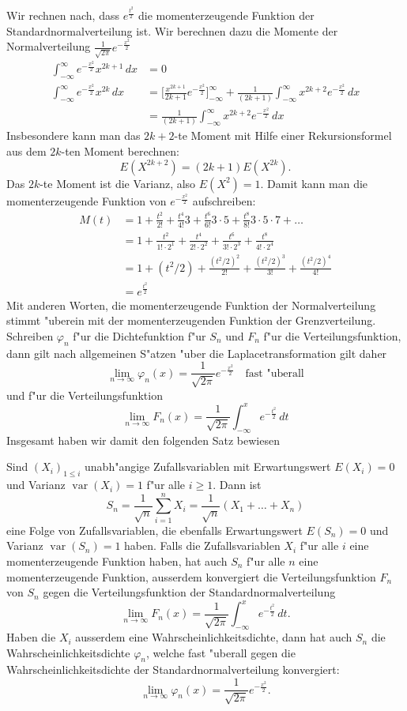 Wir rechnen nach, dass $e^{\frac{t^2}2}$ die momenterzeugende Funktion
der Standardnormalverteilung ist. Wir berechnen
dazu die Momente der Normalverteilung $\frac1{\sqrt{2\pi}}e^{-\frac{x^2}2}$
\begin{align*}
\int_{-\infty}^\infty e^{-\frac{x^2}2}x^{2k+1}\,dx&=0\\
\int_{-\infty}^\infty e^{-\frac{x^2}2}x^{2k}\,dx
&=
\biggl[\frac{x^{2k+1}}{2k+1}e^{-\frac{x^2}2}\biggr]_{-\infty}^\infty
+\frac1{(2k+1)}\int_{-\infty}^\infty x^{2k+2}e^{-\frac{x^2}2}\,dx\\
&=
\frac1{(2k+1)}\int_{-\infty}^\infty x^{2k+2}e^{-\frac{x^2}2}\,dx
\end{align*}
Insbesondere kann man das $2k+2$-te Moment mit Hilfe einer
Rekursionsformel aus dem $2k$-ten Moment berechnen:
\[
E(X^{2k+2})=(2k+1)E(X^{2k}).
\]
Das $2k$-te Moment ist die Varianz, also $E(X^2)=1$. Damit kann
man die momenterzeugende Funktion von $e^{-\frac{x^2}2}$ aufschreiben:
\begin{align*}
M(t)
&=
1+\frac{t^2}{2!} +\frac{t^4}{4!}3 +\frac{t^6}{6!}3\cdot5 +\frac{t^8}{8!}3\cdot5\cdot7+\dots\\
&=
1+\frac{t^2}{1!\cdot 2^1} +\frac{t^4}{2! \cdot 2^2} +\frac{t^6}{3!\cdot 2^3}
+\frac{t^8}{4!\cdot 2^4}\\
&=
1+(t^2/2) +\frac{(t^2/2)^2}{2!} +\frac{(t^2/2)^3}{3!}
+\frac{(t^2/2)^4}{4!}\\
&=e^{\frac{t^2}2}
\end{align*}
Mit anderen Worten, die momenterzeugende Funktion der Normalverteilung
stimmt "uberein mit der momenterzeugenden Funktion der Grenzverteilung.
Schreiben $\varphi_n$ f"ur die Dichtefunktion f"ur $S_n$ und $F_n$
f"ur die Verteilungsfunktion, dann gilt
nach allgemeinen S"atzen "uber die Laplacetransformation gilt daher
\[
\lim_{n\to\infty}\varphi_n(x)=\frac1{\sqrt{2\pi}}e^{-\frac{x^2}2}
\quad\text{fast "uberall}
\]
und f"ur die Verteilungsfunktion
\[
\lim_{n\to\infty}F_n(x)=\frac1{\sqrt{2\pi}}\int_{-\infty}^xe^{-\frac{t^2}2}\,dt
\]
Insgesamt haben wir damit den folgenden Satz bewiesen
\begin{satz}
\label{satz-zentraler-grenzwertsatz}
Sind $(X_i)_{1\le i}$ unabh"angige Zufallsvariablen mit
Erwartungswert $E(X_i)=0$ und Varianz $\operatorname{var}(X_i)=1$
f"ur alle $i\ge 1$. Dann ist
\[
S_n=\frac1{\sqrt{n}}\sum_{i=1}^nX_i=\frac1{\sqrt{n}}(X_1+\dots+X_n)
\]
eine Folge von Zufallsvariablen, die ebenfalls Erwartungswert $E(S_n)=0$
und Varianz $\operatorname{var}(S_n)=1$ haben. Falls die Zufallsvariablen
$X_i$
f"ur alle $i$ eine momenterzeugende Funktion haben, hat auch $S_n$
f"ur alle $n$ eine momenterzeugende Funktion, ausserdem konvergiert
die Verteilungsfunktion $F_n$ von $S_n$ gegen die Verteilungsfunktion der
Standardnormalverteilung
\[
\lim_{n\to\infty}F_n(x)=\frac1{\sqrt{2\pi}}\int_{-\infty}^xe^{-\frac{t^2}2}\,dt.
\]
Haben die $X_i$ ausserdem eine Wahrscheinlichkeitsdichte,
dann hat auch $S_n$
die Wahrscheinlichkeitsdichte $\varphi_n$, welche fast "uberall gegen die
Wahrscheinlichkeitsdichte der Standardnormalverteilung 
konvergiert:
\[
\lim_{n\to\infty}\varphi_n(x)=\frac1{\sqrt{2\pi}}e^{-\frac{x^2}2}.
\]
\end{satz}
